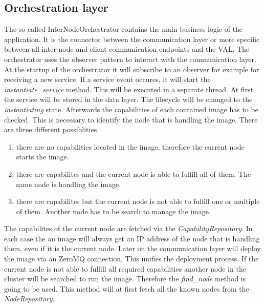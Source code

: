 \subsection{Orchestration layer}
The so called InterNodeOrchestrator contains the main business logic of the application.
It is the connector between the communication layer or more specific between all inter-node and client communication endpoints and the \ac{VAL}.
The orchestrator uses the observer pattern to interact with the communication layer.
At the startup of the orchestrator it will subscribe to an observer for example for receiving a new service.
If a service event occures, it will start the \textit{instantiate\_service} method.
This will be executed in a separate thread.
At first the service will be stored in the data layer.
The lifecycle will be changed to the \textit{instantiating} state.
Afterwards the capabilities of each contained image has to be checked.
This is necessary to identify the node that is handling the image.
There are three different possiblities.

\begin{enumerate}
  \item there are no capabilities located in the image, therefore the current node starts the image.
  \item there are capabilites and the current node is able to fulfill all of them. The same node is handling the image.
  \item there are capabilites but the current node is not able to fulfill one or multiple of them. Another node has to be search to manage the image.
\end{enumerate}

The capabilites of the current node are fetched via the \textit{CapabilityRepository}.
In each case the an image will always get an \ac{IP} address of the node that is handling them, even if it is the current node.
Later on the communication layer will deploy the image via an ZeroMQ connection.
This unifies the deployment process.
If the current node is not able to fulfill all required capabilities another node in the cluster will be searched to run the image.
Therefore the \textit{find\_node} method is going to be used.
This method will at first fetch all the known nodes from the \textit{NodeRepository}.


